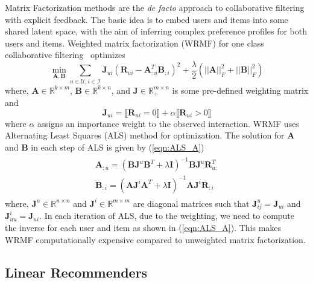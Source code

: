 \documentclass{article}
\newcommand{\indicator}[1]{\llbracket #1 \rrbracket}
\newcommand{\Real}{\mathbb{R}}
\newcommand{\R}{\mathbf{R}}
\newcommand{\A}{\mathbf{A}}
\newcommand{\B}{\mathbf{B}}
\newcommand{\I}{\mathbf{I}}
\newcommand{\J}{\mathbf{J}}
\newcommand{\numUsers}{m}
\newcommand{\numItems}{n}
\newcommand{\userSet}{\mathcal{U}}
\newcommand{\itemSet}{\mathcal{I}}
\renewcommand{\u}{u}
\renewcommand{\i}{i}
\newcommand{\ui}{\u\i}
\begin{document}
Matrix Factorization methods are the \emph{de facto} approach to collaborative filtering with explicit feedback. The basic idea is to embed users and items into some shared latent space, with the aim of inferring complex preference profiles for both users and items.
Weighted matrix factorization (WRMF) for one class collaborative filtering~\cite{Hu:2008,Pan:2009} optimizes
\begin{equation}
\label{eqn:wrmf}
\min_{ \A,\B  } \sum_{ u \in \userSet, i \in \itemSet } \J_{\ui} ( \R_{\ui} - \A_{:u}^T \B_{:i} )^2 + \frac{\lambda}{2}  ( ||\A||_F^2 + ||\B||_F^2 )
\end{equation}
where, $\A\in\Real^{k\times m}$, $\B\in\Real^{k\times n}$, and $\J \in \Real_+^{\numUsers \times \numItems}$ is some pre-defined weighting matrix  and
\begin{equation}
\label{eqn:wrmf-weight}
\J_{\ui} =  \indicator{ \R_{\ui} = 0 } + \alpha \indicator{ \R_{\ui} > 0 }
\end{equation}
where $\alpha$ assigns an importance weight to the observed interaction.
WRMF uses Alternating Least Squares (ALS) method for optimization. The solution for $\A$ and $\B$ in each step of ALS is given by (\ref{eqn:ALS_A})
\begin{align}
    \label{eqn:ALS_A}
    \begin{split}
    \A_{:u} = (\B \J^u \B^T + \lambda \I)^{-1} \B \J^u \R_{u:}^{T} \\
    \B_{:i} = (\A \J^i \A^T + \lambda \I)^{-1} \A \J^i \R_{:i}
    \end{split}
\end{align}
where, $\J^u \in \mathbb{R}^{n \times n}$ and $\J^i \in \mathbb{R}^{m \times m}$ are diagonal matrices such that $ \J^u_{ij} = \J_{ui}$ and  $\J^i_{uu} = \J_{ui}$. In each iteration of ALS, due to the weighting, we need to compute the inverse for each user and item as shown in (\ref{eqn:ALS_A}). This makes WRMF computationally expensive compared to unweighted matrix factorization.

\subsection{Linear Recommenders}
\end{document}

